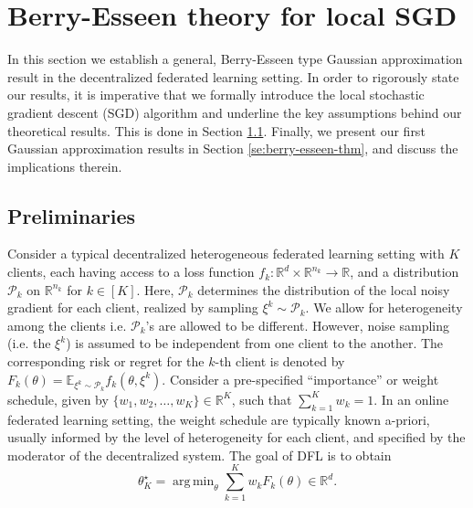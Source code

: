 \documentclass[a4paper,11pt]{article}
\numberwithin{equation}{section}
\theoremstyle{plain}
\theoremstyle{remark}
\def\IE{\mathbb{E}}
\def\R{\mathbb{R}}
\newcommand{\minparam}{\theta^\star_K}
\DeclareMathOperator*{\argmin}{arg\,min}
\begin{document}
\section{Berry-Esseen theory for local SGD} \label{se:berry-esseen}
In this section we establish a general, Berry-Esseen type Gaussian approximation result in the decentralized federated learning setting. In order to rigorously state our results, it is imperative that we formally introduce the local stochastic gradient descent (SGD) algorithm and underline the key assumptions behind our theoretical results. This is done in Section \ref{se:dfl_prelim}. Finally, we present our first Gaussian approximation results in Section \ref{se:berry-esseen-thm}, and discuss the implications therein. 
\subsection{Preliminaries} \label{se:dfl_prelim}
Consider a typical decentralized heterogeneous federated learning setting with $K$ clients, each having access to a loss function $f_k: \R^d \times \R^{n_k} \to \R$, and a distribution $\mathcal{P}_k$ on $\R^{n_k}$ for $k \in [K]$. Here, $\mathcal{P}_k$ determines the distribution of the local noisy gradient for each client, realized by sampling $\xi^k \sim \mathcal{P}_k$. We allow for heterogeneity among the clients i.e. $\mathcal{P}_k$'s are allowed to be different. However, noise sampling (i.e. the $\xi^k$) is assumed to be independent from one client to the another. The corresponding risk or regret for the $k$-th client is denoted by $F_k(\theta)=\IE_{\xi^k \sim \mathcal{P}_k}f_k(\theta, \xi^k)$. Consider a pre-specified ``importance'' or weight schedule, given by $\{w_1, w_2, \ldots, w_K\} \in \R^K$, such that $\sum_{k=1}^K w_k=1$. In an online federated learning setting, the weight schedule are typically known a-priori, usually informed by the level of heterogeneity for each client, and specified by the moderator of the decentralized system. The goal of DFL is to obtain \begin{equation}\label{eq:objective-function}\minparam=\argmin_{\theta} \sum_{k=1}^K w_k F_k(\theta) \in  \R^d.
\end{equation}
\end{document}
